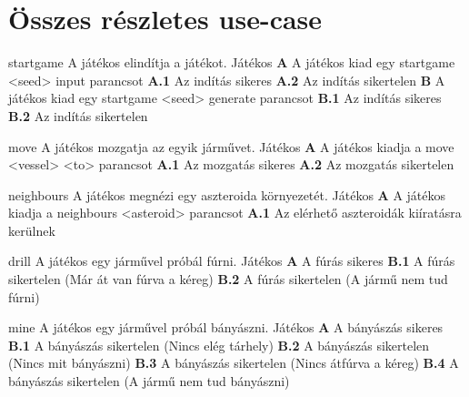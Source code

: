 \documentclass[../../projlab]{subfiles}
\begin{document}
\section{Összes részletes use-case}
\begin{use-case}
    {startgame}
    {A játékos elindítja a játékot.}
    {Játékos} 
    \textbf{A} A játékos kiad egy startgame <seed> input parancsot\newline
    \textbf{A.1} Az indítás sikeres \newline
    \textbf{A.2} Az indítás sikertelen \newline
    \textbf{B} A játékos kiad egy startgame <seed> generate parancsot\newline
	\textbf{B.1} Az indítás sikeres \newline
    \textbf{B.2} Az indítás sikertelen 

\end{use-case}

\begin{use-case}
    {move}
    {A játékos mozgatja az egyik járművet.}
    {Játékos} 
    \textbf{A} A játékos kiadja a move <vessel> <to> parancsot \newline
	\textbf{A.1} Az mozgatás sikeres \newline
    \textbf{A.2} Az mozgatás sikertelen

\end{use-case}

\begin{use-case}
    {neighbours}
    {A játékos megnézi egy aszteroida környezetét.}
    {Játékos} 
    \textbf{A} A játékos kiadja a neighbours <asteroid> parancsot \newline
	\textbf{A.1} Az elérhető aszteroidák kiíratásra kerülnek

\end{use-case}

\begin{use-case}
    {drill}
    {A játékos egy járművel próbál fúrni.}
    {Játékos} 
    \textbf{A} A fúrás sikeres \newline
    \textbf{B.1} A fúrás sikertelen (Már át van fúrva a kéreg) \newline
    \textbf{B.2} A fúrás sikertelen (A jármű nem tud fúrni) \newline
\end{use-case}

\begin{use-case}
    {mine}
    {A játékos egy járművel próbál bányászni.}
    {Játékos} 
    \textbf{A} A bányászás sikeres \newline
    \textbf{B.1} A bányászás sikertelen (Nincs elég tárhely) \newline
    \textbf{B.2} A bányászás sikertelen (Nincs mit bányászni) \newline
    \textbf{B.3} A bányászás sikertelen (Nincs átfúrva a kéreg) \newline
    \textbf{B.4} A bányászás sikertelen (A jármű nem tud bányászni) \newline
\end{use-case}
\end{document}
